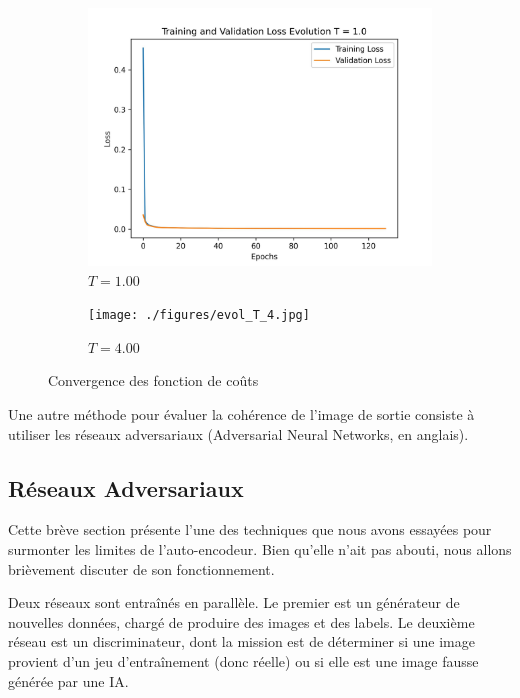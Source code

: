\documentclass[11pt, parskip=half]{scrartcl} %
\begin{document}
\begin{figure}[h]
	\begin{subfigure}[c]{0.5\textwidth}
		
		\centering
		\includegraphics[width=0.9\linewidth]{./figures/evol_T_1.jpg}
		\caption{$T = 1.00$}
		\label{fig:T1}
	\end{subfigure}
	\begin{subfigure}[c]{0.5\textwidth}
		\centering
		\texttt{[image: ./figures/evol\_T\_4.jpg]}
		\caption{$T = 4.00$}
		\label{fig:T4}
	\end{subfigure}
	\caption{Convergence des fonction de coûts}
\end{figure}

Une autre méthode pour évaluer la cohérence de l'image de sortie consiste à utiliser les réseaux adversariaux (Adversarial Neural Networks, en anglais).

\subsection{Réseaux Adversariaux}

Cette brève section présente l'une des techniques que nous avons essayées pour surmonter les limites de l'auto-encodeur. Bien qu'elle n'ait pas abouti, nous allons brièvement discuter de son fonctionnement.

Deux réseaux sont entraînés en parallèle. Le premier est un générateur de nouvelles données, chargé de produire des images et des labels. Le deuxième réseau est un discriminateur, dont la mission est de déterminer si une image provient d'un jeu d'entraînement (donc réelle) ou si elle est une image fausse générée par une IA.
\end{document}
